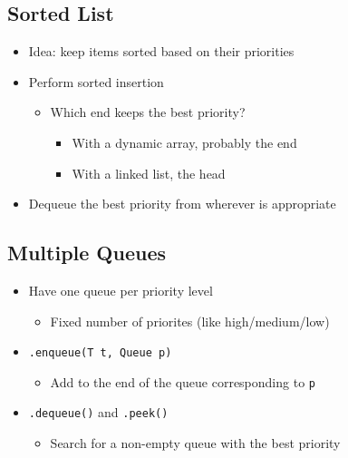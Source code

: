 \documentclass[10pt]{article}
\begin{document}
\subsection*{Sorted List}
\begin{itemize}
    \item Idea: keep items sorted based on their priorities
    \item Perform sorted insertion
    \begin{itemize}
        \item Which end keeps the best priority?
        \begin{itemize}
            \item With a dynamic array, probably the end
            \item With a linked list, the head
        \end{itemize}
    \end{itemize}
    \item Dequeue the best priority from wherever is appropriate
\end{itemize}

\subsection*{Multiple Queues}
\begin{itemize}
    \item Have one queue per priority level
    \begin{itemize}
        \item Fixed number of priorites (like high/medium/low)
    \end{itemize}
    \item \texttt{.enqueue(T t, Queue p)}
    \begin{itemize}
        \item Add to the end of the queue corresponding to \texttt{p}
    \end{itemize}
    \item \texttt{.dequeue()} and \texttt{.peek()}
    \begin{itemize}
        \item Search for a non-empty queue with the best priority
    \end{itemize}
\end{itemize}
\end{document}
